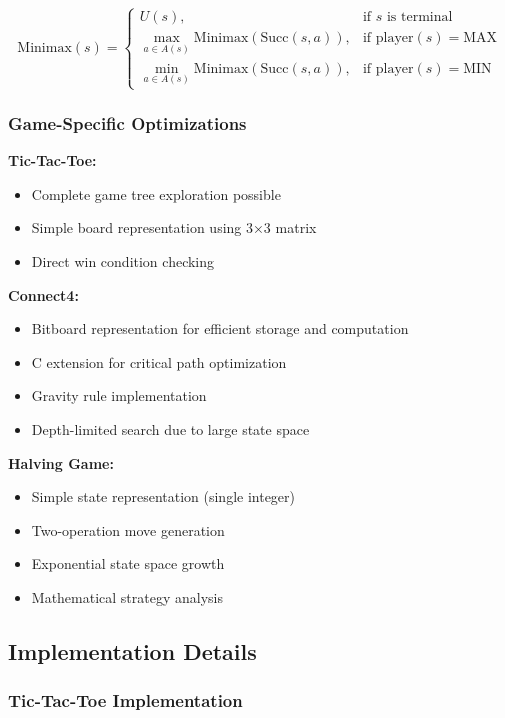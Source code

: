 \documentclass[12pt]{article}
\begin{document}
\[
\text{Minimax}(s) =
\begin{cases}
U(s), & \text{if } s \text{ is terminal} \\
\max_{a \in A(s)} \text{Minimax}(\text{Succ}(s, a)), & \text{if } \text{player}(s) = \text{MAX} \\
\min_{a \in A(s)} \text{Minimax}(\text{Succ}(s, a)), & \text{if } \text{player}(s) = \text{MIN}
\end{cases}
\]

\subsubsection{Game-Specific Optimizations}

\textbf{Tic-Tac-Toe:}
\begin{itemize}
    \item Complete game tree exploration possible
    \item Simple board representation using 3×3 matrix
    \item Direct win condition checking
\end{itemize}

\textbf{Connect4:}
\begin{itemize}
    \item Bitboard representation for efficient storage and computation
    \item C extension for critical path optimization
    \item Gravity rule implementation
    \item Depth-limited search due to large state space
\end{itemize}

\textbf{Halving Game:}
\begin{itemize}
    \item Simple state representation (single integer)
    \item Two-operation move generation
    \item Exponential state space growth
    \item Mathematical strategy analysis
\end{itemize}

\subsection{Implementation Details}

\subsubsection{Tic-Tac-Toe Implementation}
\end{document}
